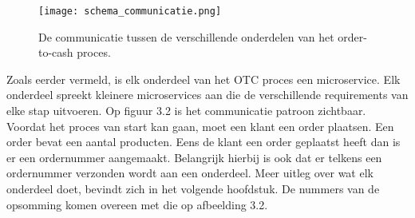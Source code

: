 \begin{figure}[h!]
	\texttt{[image: schema\_communicatie.png]}
	\caption{De communicatie tussen de verschillende onderdelen van het order-to-cash proces.}
	\centering
\end{figure}
Zoals eerder vermeld, is elk onderdeel van het OTC proces een microservice. Elk onderdeel spreekt kleinere microservices aan die de verschillende requirements van elke stap uitvoeren.
Op figuur 3.2 is het communicatie patroon zichtbaar.
Voordat het proces van start kan gaan, moet een klant een order plaatsen. Een order bevat een aantal producten. Eens de klant een order geplaatst heeft dan is er een ordernummer aangemaakt. Belangrijk hierbij is ook dat er telkens een ordernummer verzonden wordt aan een onderdeel.
Meer uitleg over wat elk onderdeel doet, bevindt zich in het volgende hoofdstuk.
De nummers van de opsomming komen overeen met die op afbeelding 3.2.
